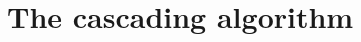 \documentclass[smallextended]{svjour3}
\begin{document}
\section{The cascading algorithm}
\label{sec:algo}
\end{document}
